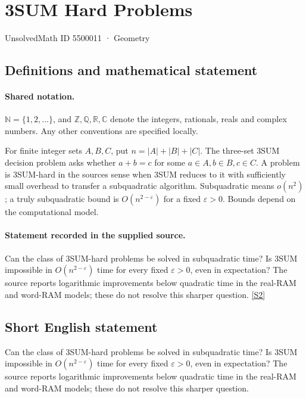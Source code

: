 \documentclass[11pt]{article}
\newcommand{\sref}[2]{\hyperlink{source:#1:#2}{[S#2]}}
\begin{document}
\setcounter{section}{5500010}
\section{3SUM Hard Problems}\label{5500011}
{\small\sffamily UnsolvedMath ID 5500011 · Geometry}
\subsection{Definitions and mathematical statement}

\paragraph{Shared notation.}$\mathbb N=\{1,2,\ldots\}$, and $\mathbb Z,\mathbb Q,\mathbb R,\mathbb C$ denote the integers, rationals, reals and complex numbers. Any other conventions are specified locally.


For finite integer sets $A,B,C$, put $n=|A|+|B|+|C|$. The three-set 3SUM decision problem asks whether $a+b=c$ for some $a\in A,b\in B,c\in C$. A problem is 3SUM-hard in the source\textquotesingle s sense when 3SUM reduces to it with sufficiently small overhead to transfer a subquadratic algorithm. Subquadratic means $o(n^2)$; a truly subquadratic bound is $O(n^{2-\varepsilon})$ for a fixed $\varepsilon>0$. Bounds depend on the computational model.
\paragraph{Statement recorded in the supplied source.}
Can the class of 3SUM-hard problems be solved in subquadratic time? Is 3SUM impossible in $O(n^{2-\varepsilon})$ time for every fixed $\varepsilon>0$, even in expectation? The source reports logarithmic improvements below quadratic time in the real-RAM and word-RAM models; these do not resolve this sharper question. \sref{5500011}{2}
\subsection{Short English statement}
Can the class of 3SUM-hard problems be solved in subquadratic time? Is 3SUM impossible in $O(n^{2-\varepsilon})$ time for every fixed $\varepsilon>0$, even in expectation? The source reports logarithmic improvements below quadratic time in the real-RAM and word-RAM models; these do not resolve this sharper question.
\end{document}
